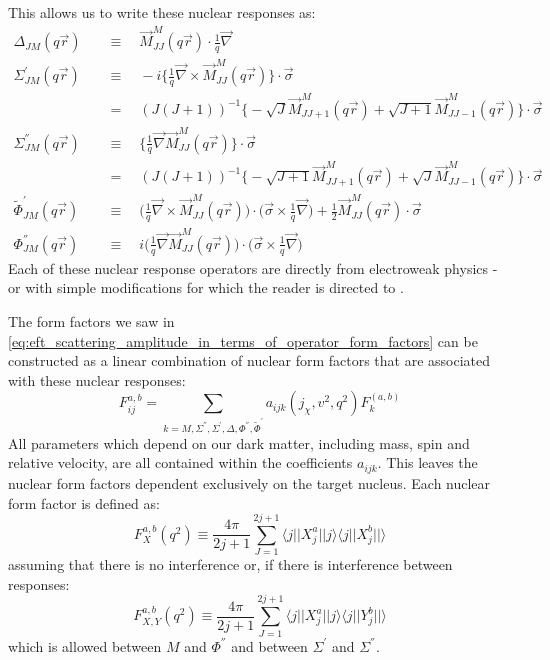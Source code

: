 This allows us to write these nuclear responses as:
\begin{equation}
\begin{split}
    \Delta_{JM}(q\vec{r})\quad &\equiv\quad \vec{M}_{JJ}^{M}(q\vec{r}) \cdot \frac{1}{q}\vec{\nabla} \\
    \Sigma^{'}_{JM}(q\vec{r})\quad &\equiv\quad -i \bigg\{ \frac{1}{q} \vec{\nabla} \times \vec{M}^{M}_{JJ}(q\vec{r}) \bigg\} \cdot \vec{\sigma} \\
    & =\quad (J(J + 1))^{-1}\bigg\{-\sqrt{J}\vec{M}^{M}_{JJ+1}(q\vec{r}) + \sqrt{J+1} \vec{M}^{M}_{JJ-1}(q\vec{r}) \bigg\} \cdot \vec{\sigma} \\
    \Sigma^{''}_{JM}(q\vec{r})\quad &\equiv\quad \bigg\{\frac{1}{q}\vec{\nabla}\vec{M}^{M}_{JJ}(q\vec{r}) \bigg\} \cdot \vec{\sigma} \\
    & =\quad (J(J + 1))^{-1} \bigg\{-\sqrt{J+1}\vec{M}^{M}_{JJ+1}(q\vec{r}) + \sqrt{J}\vec{M}^{M}_{JJ-1}(q\vec{r}) \bigg\} \cdot \vec{\sigma} \\
    \tilde{\Phi}^{'}_{JM}(q\vec{r})\quad &\equiv\quad \bigg( \frac{1}{q}\vec{\nabla} \times \vec{M}^{M}_{JJ}(q\vec{r}) \bigg) \cdot \bigg( \vec{\sigma} \times \frac{1}{q} \vec{\nabla} \bigg) + \frac{1}{2}\vec{M}^{M}_{JJ}(q\vec{r}) \cdot \vec{\sigma} \\
    \Phi^{''}_{JM}(q\vec{r})\quad &\equiv\quad i \bigg( \frac{1}{q}\vec{\nabla}\vec{M}^{M}_{JJ}(q\vec{r}) \bigg) \cdot \bigg( \vec{\sigma} \times \frac{1}{q}\vec{\nabla} \bigg)
\end{split}
\label{eq:eft_nuclear_response_operators}
\end{equation}
Each of these nuclear response operators are directly from electroweak physics - or with simple modifications for which the reader is directed to \cite{Fitzpatrick_2013_ref}.
\par
The form factors we saw in \autoref{eq:eft_scattering_amplitude_in_terms_of_operator_form_factors} can be constructed as a linear combination of nuclear form factors that are associated with these nuclear responses:
\begin{equation}
    F^{a,b}_{ij} = \sum_{k=M,\Sigma^{''},\Sigma^{'},\Delta, \Phi^{''},\tilde{\Phi}^{'}} a_{ijk}(j_\chi,v^2,q^2) F_{k}^{(a,b)}
    \label{eq:eft_form_factor_relation_to_nuclear_form_factors}
\end{equation}
All parameters which depend on our dark matter, including mass, spin and relative velocity, are all contained within the coefficients $a_{ijk}$.
This leaves the nuclear form factors dependent exclusively on the target nucleus.
Each nuclear form factor is defined as:
\begin{equation}
    F^{a,b}_X(q^2) \equiv \frac{4 \pi}{2j + 1} \sum^{2j+1}_{J=1} \langle j || X^{a}_{j} || j \rangle \langle j || X^{b}_{j} || \rangle 
\end{equation}
assuming that there is no interference or, if there is interference between responses:
\begin{equation}
    F^{a,b}_{X,Y}(q^2) \equiv \frac{4 \pi}{2j + 1} \sum^{2j+1}_{J=1} \langle j || X^{a}_{j} || j \rangle \langle j || Y^{b}_{j} || \rangle 
\end{equation}
which is allowed between $M$ and $\Phi^{''}$ and between $\Sigma^{'}$ and $\Sigma^{''}$.

